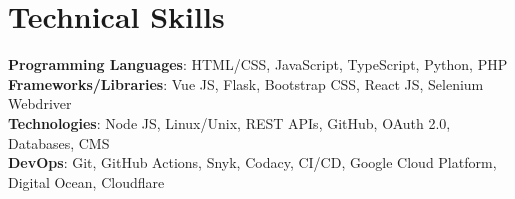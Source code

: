 \section{Technical Skills}
 \begin{itemize}[leftmargin=0.15in, label={}]
    \small{\item{
     \textbf{Programming Languages}{: HTML/CSS, JavaScript, TypeScript, Python, PHP} \\
     \textbf{Frameworks/Libraries}{: Vue JS, Flask, Bootstrap CSS, React JS, Selenium Webdriver} \\
     \textbf{Technologies}{: Node JS, Linux/Unix, REST APIs, GitHub, OAuth 2.0, Databases, CMS } \\
     \textbf{DevOps}{: Git, GitHub Actions, Snyk, Codacy, CI/CD, Google Cloud Platform, Digital Ocean, Cloudflare } 
    }}
 \end{itemize}  